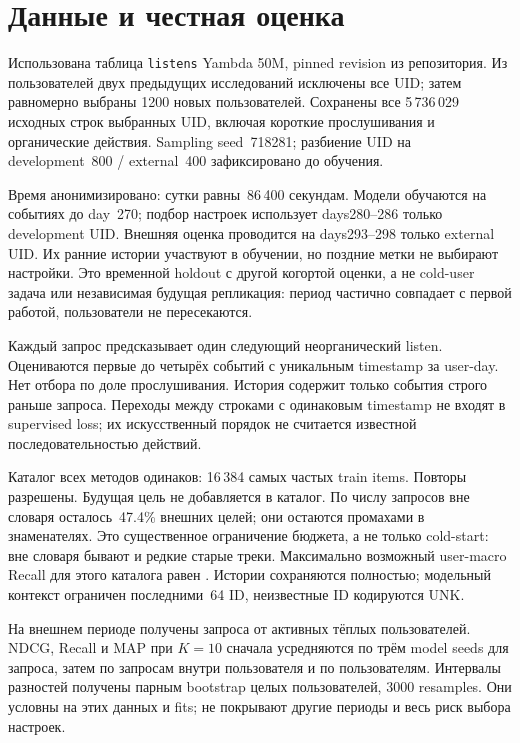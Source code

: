 \documentclass[10pt,a4paper,twocolumn]{article}
\begin{document}
\section{Данные и честная оценка}

Использована таблица \texttt{listens} Yambda 50M, pinned revision из
репозитория. Из пользователей двух предыдущих исследований исключены
все UID; затем равномерно выбраны 1200 новых пользователей.
Сохранены все 5\,736\,029 исходных строк выбранных UID, включая короткие
прослушивания и органические действия. Sampling seed~718281;
разбиение UID на development~800 / external~400 зафиксировано до обучения.

Время анонимизировано: сутки равны~86\,400 секундам.
Модели обучаются на событиях до day~270; подбор настроек использует
days280--286 только development UID. Внешняя оценка проводится на
days293--298 только external UID. Их ранние истории участвуют в обучении,
но поздние метки не выбирают настройки. Это временной holdout с другой
когортой оценки, а не cold-user задача или независимая будущая репликация:
период частично совпадает с первой работой, пользователи не пересекаются.

Каждый запрос предсказывает один следующий неорганический listen.
Оцениваются первые до четырёх событий с уникальным timestamp за user-day.
Нет отбора по доле прослушивания. История содержит только события
строго раньше запроса. Переходы между строками с одинаковым timestamp
не входят в supervised loss; их искусственный порядок не считается
известной последовательностью действий.

Каталог всех методов одинаков: 16\,384 самых частых train items.
Повторы разрешены. Будущая цель не добавляется в каталог.
По числу запросов вне словаря осталось~47.4\% внешних целей;
они остаются промахами в знаменателях. Это существенное ограничение
бюджета, а не только cold-start: вне словаря бывают и редкие старые треки.
Максимально возможный user-macro Recall для этого каталога равен
\MacroCeiling{}. Истории сохраняются полностью; модельный контекст
ограничен последними~64 ID, неизвестные ID кодируются UNK.

На внешнем периоде получены \EvalQueries{} запроса от \EvalUsers{} активных
тёплых пользователей. NDCG, Recall и MAP при $K=10$ сначала усредняются
по трём model seeds для запроса, затем по запросам внутри пользователя
и по пользователям. Интервалы разностей получены парным bootstrap
целых пользователей, 3000 resamples. Они условны на этих данных и fits;
не покрывают другие периоды и весь риск выбора настроек.
\end{document}
